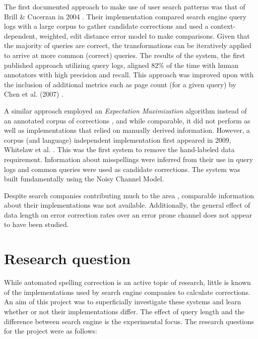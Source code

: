 \documentclass{csfourzero}
\begin{document}
The first documented approach to make use of user search patterns was that of Brill \& Cucerzan in 2004 \cite{webuserpoweredspelling}. Their implementation compared search engine query logs with a large corpus to gather candidate corrections and used a context-dependent, weighted, edit distance error model to make comparisons. Given that the majority of queries are correct, the transformations can be iteratively applied to arrive at more common (correct) queries. The results of the system, the first published approach utilizing query logs, aligned 82\% of the time with human annotators with high precision and recall. This approach was improved upon with the inclusion of additional metrics such as page count (for a given query) by Chen et al. (2007) \cite{webuser3}.

A similar approach employed an \textit{Expectation Maximization} algorithm instead of an annotated corpus of corrections \cite{webuser2learningerrormodel}, and while comparable, it did not perform as well as implementations that relied on manually derived information. However, a corpus (and language) independent implementation first appeared in 2009, Whitelaw et al. \cite{webuser4google2009}. This was the first system to remove the hand-labeled data requirement. Information about misspellings were inferred from their use in query logs and common queries were used as candidate corrections. The system was built fundamentally using the Noisy Channel Model.

Despite search companies contributing much to the area \cite{webuser3, webuserpoweredspelling, microranker, microphone, webuser4google2009}, comparable information about their implementations was not available. Additionally, the general effect of data length on error correction rates over an error prone channel does not appear to have been studied.

\section{Research question}
\label{sec:rq}

While automated spelling correction is an active topic of research, little is known of the implementations used by search engine companies to calculate corrections. An aim of this project was to superficially investigate these systems and learn whether or not their implementations differ. The effect of query length and the difference between search engine is the experimental focus. The research questions for the project were as follows:
\end{document}

